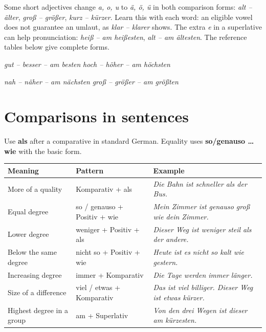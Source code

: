 Some short adjectives change \textit{a, o, u} to \textit{ä, ö, ü} in both
comparison forms: \textit{alt -- älter}, \textit{groß -- größer},
\textit{kurz -- kürzer}. Learn this with each word: an eligible vowel does
not guarantee an umlaut, as \textit{klar -- klarer} shows.
The extra \textit{e} in a superlative can help pronunciation:
\textit{heiß -- am heißesten}, \textit{alt -- am ältesten}.
The reference tables below give complete forms.

\begin{tcolorbox}[colback=referenceYellowBg,colframe=genderPlural,title={Forms to learn directly},fonttitle=\bfseries]
\textit{gut -- besser -- am besten}\qquad
\textit{hoch -- höher -- am höchsten}\par
\textit{nah -- näher -- am nächsten}\qquad
\textit{groß -- größer -- am größten}
\end{tcolorbox}

\section{Comparisons in sentences}

Use \textbf{als} after a comparative in standard German. Equality uses
\textbf{so/genauso \ldots{} wie} with the basic form.

\begin{center}
\small
{}
\begin{tabularx}{\textwidth}{@{}lXX@{}}
\toprule
Meaning & Pattern & Example \\
\midrule
More of a quality & Komparativ + als
  & \textit{Die Bahn ist schneller als der Bus.} \\
Equal degree & so / genauso + Positiv + wie
  & \textit{Mein Zimmer ist genauso groß wie dein Zimmer.} \\
Lower degree & weniger + Positiv + als
  & \textit{Dieser Weg ist weniger steil als der andere.} \\
Below the same degree & nicht so + Positiv + wie
  & \textit{Heute ist es nicht so kalt wie gestern.} \\
Increasing degree & immer + Komparativ
  & \textit{Die Tage werden immer länger.} \\
Size of a difference & viel / etwas + Komparativ
  & \textit{Das ist viel billiger. Dieser Weg ist etwas kürzer.} \\
Highest degree in a group & am + Superlativ
  & \textit{Von den drei Wegen ist dieser am kürzesten.} \\
\bottomrule
\end{tabularx}
\end{center}

